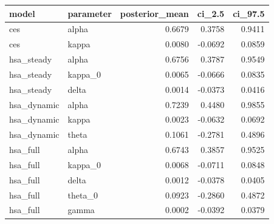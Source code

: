 \begin{tabular}{llrrr}
\toprule
model & parameter & posterior\_mean & ci\_2.5 & ci\_97.5 \\
\midrule
ces & alpha & 0.6679 & 0.3758 & 0.9411 \\
ces & kappa & 0.0080 & -0.0692 & 0.0859 \\
hsa\_steady & alpha & 0.6756 & 0.3787 & 0.9549 \\
hsa\_steady & kappa\_0 & 0.0065 & -0.0666 & 0.0835 \\
hsa\_steady & delta & 0.0014 & -0.0373 & 0.0416 \\
hsa\_dynamic & alpha & 0.7239 & 0.4480 & 0.9855 \\
hsa\_dynamic & kappa & 0.0023 & -0.0632 & 0.0692 \\
hsa\_dynamic & theta & 0.1061 & -0.2781 & 0.4896 \\
hsa\_full & alpha & 0.6743 & 0.3857 & 0.9525 \\
hsa\_full & kappa\_0 & 0.0068 & -0.0711 & 0.0848 \\
hsa\_full & delta & 0.0012 & -0.0378 & 0.0405 \\
hsa\_full & theta\_0 & 0.0923 & -0.2860 & 0.4872 \\
hsa\_full & gamma & 0.0002 & -0.0392 & 0.0379 \\
\bottomrule
\end{tabular}
